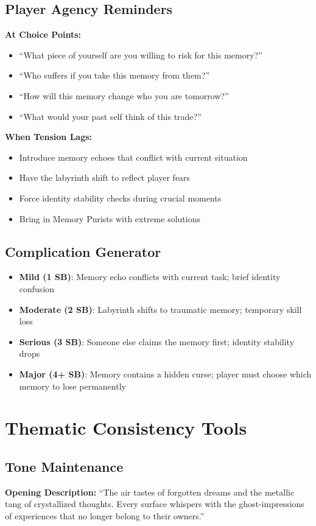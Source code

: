 \documentclass[11pt]{article}
\begin{document}
\subsection*{Player Agency Reminders}
\textbf{At Choice Points:}
\begin{itemize}[leftmargin=*]
  \item ``What piece of yourself are you willing to risk for this memory?''
  \item ``Who suffers if you take this memory from them?''
  \item ``How will this memory change who you are tomorrow?''
  \item ``What would your past self think of this trade?''
\end{itemize}

\textbf{When Tension Lags:}
\begin{itemize}[leftmargin=*]
  \item Introduce memory echoes that conflict with current situation
  \item Have the labyrinth shift to reflect player fears
  \item Force identity stability checks during crucial moments
  \item Bring in Memory Purists with extreme solutions
\end{itemize}

\subsection*{Complication Generator}
\begin{itemize}[leftmargin=*]
  \item \textbf{Mild (1 SB)}: Memory echo conflicts with current task; brief identity confusion
  \item \textbf{Moderate (2 SB)}: Labyrinth shifts to traumatic memory; temporary skill loss
  \item \textbf{Serious (3 SB)}: Someone else claims the memory first; identity stability drops
  \item \textbf{Major (4+ SB)}: Memory contains a hidden curse; player must choose which memory to lose permanently
\end{itemize}

\section*{Thematic Consistency Tools}

\subsection*{Tone Maintenance}
\textbf{Opening Description:} ``The air tastes of forgotten dreams and the metallic tang of crystallized thoughts. Every surface whispers with the ghost-impressions of experiences that no longer belong to their owners.''
\end{document}
